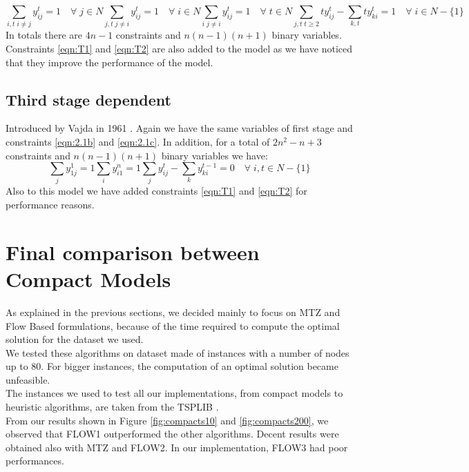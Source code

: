 \begin{subequations} 
	\begin{equation}
		\sum_{i,t \; i \neq j} y_{ij}^t = 1 \quad \forall \; j \in N
	\end{equation}
	\begin{equation}
		\sum_{j,t \; j \neq i} y_{ij}^t = 1 \quad \forall \; i \in N
	\end{equation}
	\begin{equation}
		\sum_{i \; j \neq i} y_{ij}^t = 1 \quad \forall \; t \in N
	\end{equation}
	\begin{equation}
		\sum_{j,t \; t \geq 2} ty_{ij}^t - \sum_{k,t} ty_{ki}^t = 1 \quad \forall \;i \in N-\lbrace 1 \rbrace
	\end{equation}
\end{subequations}
In totals there are $4n-1$ constraints and $n(n-1)(n+1)$ binary variables. Constraints \ref{eqn:T1} and \ref{eqn:T2} are also added to the model as we have noticed that they improve the performance of the model.

\subsection{Third stage dependent}
Introduced by Vajda in 1961 \cite{timestage3}. Again we have the same variables of first stage and constraints \ref{eqn:2.1b} and \ref{eqn:2.1c}. In addition, 
for a total of $2n^2-n+3$ constraints and $n(n-1)(n+1)$ binary variables we have:
\begin{subequations}
	\begin{equation}
		\sum_{j} y_{1j}^1 = 1
	\end{equation}
	\begin{equation}
		\sum_{i} y_{i1}^n = 1
	\end{equation}
	\begin{equation}
		\sum_{j} y_{ij}^t - \sum_{k} y_{ki}^{t-1} = 0 \quad \forall \; i,t \in N-\lbrace 1 \rbrace
	\end{equation}
\end{subequations}
Also to this model we have added constraints \ref{eqn:T1} and \ref{eqn:T2} for performance reasons.
\newpage
\section{Final comparison between Compact Models}
As explained in the previous sections, we decided mainly to focus on MTZ and Flow Based formulations, because of the time required to compute the optimal solution for the dataset we used.\\
We tested these algorithms on dataset made of instances with a number of nodes up to 80. For bigger instances, the computation of an optimal solution became unfeasible.\\
The instances we used to test all our implementations, from compact models to heuristic algorithms, are taken from the TSPLIB \cite{tsplib}. \\
From our results shown in Figure \ref{fig:compacts10} and \ref{fig:compacts200}, we observed that FLOW1 outperformed the other algorithms. Decent results were obtained also with MTZ and FLOW2. In our implementation, FLOW3 had poor performances.

